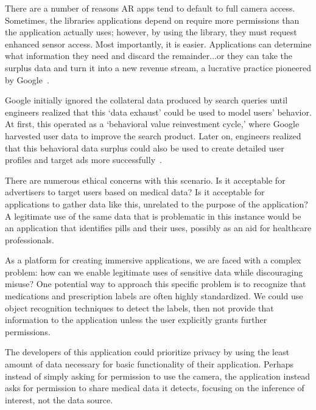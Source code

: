 There are a number of reasons AR apps tend to default to full camera access. Sometimes, the libraries applications depend on require more permissions than the application actually uses; however, by using the library, they must request enhanced sensor access. Most importantly, it is easier. Applications can determine what information they need and discard the remainder...or they can take the surplus data and turn it into a new revenue stream, a lucrative practice pioneered by Google~\cite{zuboff2019age}.

Google initially ignored the collateral data produced by search queries until engineers realized that this `data exhaust' could be used to model users' behavior. At first, this operated as a `behavioral value reinvestment cycle,' where Google harvested user data to improve the search product. Later on, engineers realized that this behavioral data surplus could also be used to create detailed user profiles and target ads more successfully~\cite{patent2003targetedad}.

There are numerous ethical concerns with this scenario. Is it acceptable for advertisers to target users based on medical data? Is it acceptable for applications to gather data like this, unrelated to the purpose of the application?  A legitimate use of the same data that is problematic in this instance would be an application that identifies pills and their uses, possibly as an aid for healthcare professionals.

As a platform for creating immersive applications, we are faced with a complex problem: how can we enable legitimate uses of sensitive data while discouraging misuse? One potential way to approach this specific problem is to recognize that medications and prescription labels are often highly standardized. We could use object recognition techniques to detect the labels, then not provide that information to the application unless the user explicitly grants further permissions.


The developers of this application could prioritize privacy by using the least amount of data necessary for basic functionality of their application. Perhaps instead of simply asking for permission to use the camera, the application instead asks for permission to share medical data it detects, focusing on the inference of interest, not the data source.


